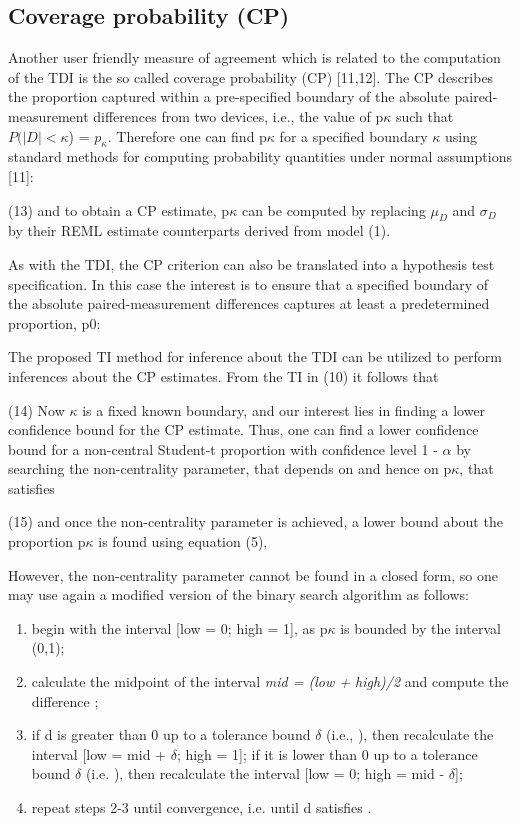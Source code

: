 \documentclass[12pt, a4paper]{report}
\theoremstyle{plain}
\theoremstyle{definition}
\theoremstyle{remark}
\begin{document}
	

		\subsection*{Coverage probability (CP)}
	Another user friendly measure of agreement which is related to the computation of the TDI is the so called coverage probability (CP) [11,12]. 
	The CP describes the proportion captured within a pre-specified boundary of the absolute paired-measurement differences from two devices, i.e., the value of p$\kappa$ such that $P(|D| < \kappa$) = $p_\kappa$. Therefore one can find p$\kappa$ for a specified boundary $\kappa$ using standard methods for computing probability quantities under normal assumptions [11]:
	
	(13)
	and to obtain a CP estimate, p$\kappa$ can be computed by replacing $\mu_D$ and $\sigma_D$ by their REML estimate counterparts derived from model (1).
	
	As with the TDI, the CP criterion can also be translated into a hypothesis test specification. 
	In this case the interest is to ensure that a specified boundary of the absolute paired-measurement differences captures at least a predetermined proportion, p0:
	
	
	The proposed TI method for inference about the TDI can be utilized to perform inferences about the CP estimates. From the TI in (10) it follows that
	
	(14)
	Now $\kappa$ is a fixed known boundary, and our interest lies in finding a lower confidence bound for the CP estimate. 
	Thus, one can find a lower confidence bound for a non-central Student-t proportion with confidence level 1 - $\alpha$ by searching the non-centrality parameter, 
	that depends on  and hence on p$\kappa$, that satisfies
	
	(15)
	and once the non-centrality parameter  is achieved, a lower bound about the proportion p$\kappa$ is found using equation (5), 
	
	
	However, the non-centrality parameter cannot be found in a closed form, so one may use again a modified version of the binary search algorithm as follows:
	
	\begin{enumerate}
		\item begin with the interval [low = 0; high = 1], as p$\kappa$ is bounded by the interval (0,1);
		
		\item calculate the midpoint of the interval \textit{mid = (low + high)/2} and compute the difference ;
		
		\item if d is greater than 0 up to a tolerance bound $\delta$ (i.e., ), then recalculate the interval [low = mid + $\delta$; high = 1]; if it is 
		lower than 0 up to a tolerance bound $\delta$ (i.e. ), then recalculate the interval [low = 0; high = mid - $\delta$];
		
		\item repeat steps 2-3 until convergence, i.e. until d satisfies .
	\end{enumerate}
	
\end{document}

